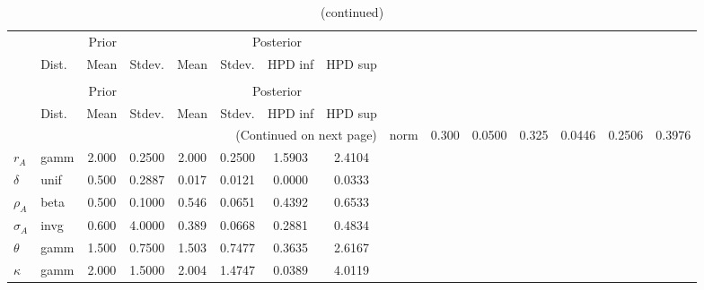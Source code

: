  
\begin{center}
\begin{longtable}{llcccccc} 
\caption{Results from Metropolis-Hastings (parameters)}
 \label{Table:MHPosterior:1}\\
\toprule 
  & \multicolumn{3}{c}{Prior}  &  \multicolumn{4}{c}{Posterior} \\
  \cmidrule(r{.75em}){2-4} \cmidrule(r{.75em}){5-8}
  & Dist. & Mean  & Stdev. & Mean & Stdev. & HPD inf & HPD sup\\
\midrule \endfirsthead 
\caption{(continued)}\\\toprule 
  & \multicolumn{3}{c}{Prior}  &  \multicolumn{4}{c}{Posterior} \\
  \cmidrule(r{.75em}){2-4} \cmidrule(r{.75em}){5-8}
  & Dist. & Mean  & Stdev. & Mean & Stdev. & HPD inf & HPD sup\\
\midrule \endhead 
\bottomrule \multicolumn{8}{r}{(Continued on next page)} \endfoot 
\bottomrule \endlastfoot 
${\alpha}$ & norm &   0.300 & 0.0500 &   0.325& 0.0446 &  0.2506 &  0.3976 \\ 
${r_{A}}$ & gamm &   2.000 & 0.2500 &   2.000& 0.2500 &  1.5903 &  2.4104 \\ 
${\delta}$ & unif &   0.500 & 0.2887 &   0.017& 0.0121 &  0.0000 &  0.0333 \\ 
${\rho_A}$ & beta &   0.500 & 0.1000 &   0.546& 0.0651 &  0.4392 &  0.6533 \\ 
${\sigma_A}$ & invg &   0.600 & 4.0000 &   0.389& 0.0668 &  0.2881 &  0.4834 \\ 
${\theta}$ & gamm &   1.500 & 0.7500 &   1.503& 0.7477 &  0.3635 &  2.6167 \\ 
${\kappa}$ & gamm &   2.000 & 1.5000 &   2.004& 1.4747 &  0.0389 &  4.0119 \\ 
\end{longtable}
 \end{center}
